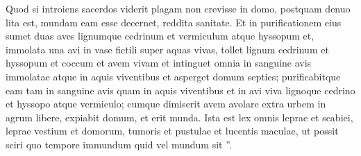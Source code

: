 \begin{biblechapter}
\begin{biblechapter}
\begin{biblechapter}
\begin{biblechapter}
\begin{biblechapter}
\begin{biblechapter}
\begin{biblechapter}
\begin{biblechapter}
\begin{biblechapter}
\begin{biblechapter}
\begin{biblechapter}
\begin{biblechapter}
\begin{biblechapter}
\begin{biblechapter}
 \verse Quod si introiens sacerdos viderit plagam non crevisse in domo, postquam denuo lita est, mundam eam esse decernet, reddita sanitate. 
\verse Et in purificationem eius sumet duas aves lignumque cedrinum et vermiculum atque hyssopum 
\verse et, immolata una avi in vase fictili super aquas vivas, 
\verse tollet lignum cedrinum et hyssopum et coccum et avem vivam et intinguet omnia in sanguine avis immolatae atque in aquis viventibus et asperget domum septies; 
 \verse purificabitque eam tam in sanguine avis quam in aquis viventibus et in avi viva lignoque cedrino et hyssopo atque vermiculo; 
\verse cumque dimiserit avem avolare extra urbem in agrum libere, expiabit domum, et erit munda.
 \verse Ista est lex omnis leprae et scabiei, 
\verse leprae vestium et domorum, 
 \verse tumoris et pustulae et lucentis maculae, 
\verse ut possit sciri quo tempore immundum quid vel mundum sit ”.
 

\end{biblechapter}
\end{biblechapter}
\end{biblechapter}
\end{biblechapter}
\end{biblechapter}
\end{biblechapter}
\end{biblechapter}
\end{biblechapter}
\end{biblechapter}
\end{biblechapter}
\end{biblechapter}
\end{biblechapter}
\end{biblechapter}
\end{biblechapter}
